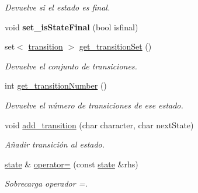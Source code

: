 \begin{DoxyCompactItemize}
\begin{DoxyCompactList}\small\item\em Devuelve si el estado es final. \end{DoxyCompactList}\item 
\mbox{\label{classstate_a5ee31622b73ca779d73cd0299a8ce4a2}} 
void {\bfseries set\+\_\+is\+State\+Final} (bool isfinal)
\item 
\mbox{\label{classstate_a500a0963e1f0d67227083caf46225795}} 
set$<$ \mbox{\hyperlink{classtransition}{transition}} $>$ \mbox{\hyperlink{classstate_a500a0963e1f0d67227083caf46225795}{get\+\_\+transition\+Set}} ()
\begin{DoxyCompactList}\small\item\em Devuelve el conjunto de transiciones. \end{DoxyCompactList}\item 
\mbox{\label{classstate_ac9a2cc746237061c5b524d576f47e9df}} 
int \mbox{\hyperlink{classstate_ac9a2cc746237061c5b524d576f47e9df}{get\+\_\+transition\+Number}} ()
\begin{DoxyCompactList}\small\item\em Devuelve el número de transiciones de ese estado. \end{DoxyCompactList}\item 
\mbox{\label{classstate_ab5407ccf961f8429c9419a24d39a3b58}} 
void \mbox{\hyperlink{classstate_ab5407ccf961f8429c9419a24d39a3b58}{add\+\_\+transition}} (char character, char next\+State)
\begin{DoxyCompactList}\small\item\em Añadir transición al estado. \end{DoxyCompactList}\item 
\mbox{\label{classstate_a84e8155bb10a8acca7295df47b5bd51b}} 
\mbox{\hyperlink{classstate}{state}} \& \mbox{\hyperlink{classstate_a84e8155bb10a8acca7295df47b5bd51b}{operator=}} (const \mbox{\hyperlink{classstate}{state}} \&rhs)
\begin{DoxyCompactList}\small\item\em Sobrecarga operador =. \end{DoxyCompactList}\item 
\mbox{\label{classstate_a11f919a4500e40494d3f24f12e1d0e67}} 

\end{DoxyCompactItemize}
